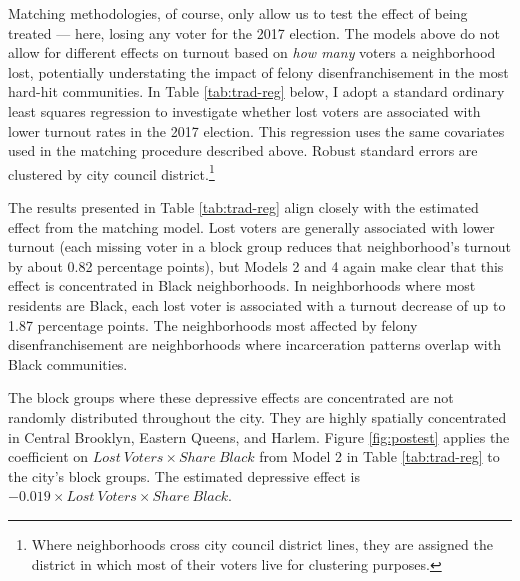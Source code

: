 \documentclass[
  12pt,
]{article}
\begin{document}
Matching methodologies, of course, only allow us to test the effect of being treated --- here, losing any voter for the 2017 election. The models above do not allow for different effects on turnout based on \emph{how many} voters a neighborhood lost, potentially understating the impact of felony disenfranchisement in the most hard-hit communities. In Table \ref{tab:trad-reg} below, I adopt a standard ordinary least squares regression to investigate whether lost voters are associated with lower turnout rates in the 2017 election. This regression uses the same covariates used in the matching procedure described above. Robust standard errors are clustered by city council district.\footnote{Where neighborhoods cross city council district lines, they are assigned the district in which most of their voters live for clustering purposes.}



The results presented in Table \ref{tab:trad-reg} align closely with the estimated effect from the matching model. Lost voters are generally associated with lower turnout (each missing voter in a block group reduces that neighborhood's turnout by about 0.82 percentage points), but Models 2 and 4 again make clear that this effect is concentrated in Black neighborhoods. In neighborhoods where most residents are Black, each lost voter is associated with a turnout decrease of up to 1.87 percentage points. The neighborhoods most affected by felony disenfranchisement are neighborhoods where incarceration patterns overlap with Black communities.

The block groups where these depressive effects are concentrated are not randomly distributed throughout the city. They are highly spatially concentrated in Central Brooklyn, Eastern Queens, and Harlem. Figure \ref{fig:postest} applies the coefficient on \(Lost\ Voters \times Share\ Black\) from Model 2 in Table \ref{tab:trad-reg} to the city's block groups. The estimated depressive effect is \(-0.019\times Lost\ Voters \times Share\ Black\).
\end{document}
